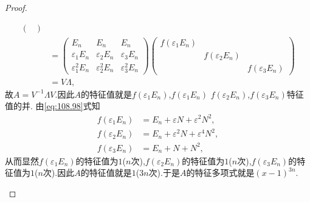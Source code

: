 \documentclass[../../main.tex]{subfiles}
\begin{document}
\begin{proof}
\begin{enumerate}[(1)]
\begin{align*}
\begin{pmatrix}
\end{pmatrix} \\
&= \begin{pmatrix}
E_n & E_n & E_n\\
\varepsilon_1 E_n & \varepsilon_2 E_n & \varepsilon_3 E_n\\
\varepsilon_1^2 E_n & \varepsilon_2^2 E_n & \varepsilon_3^2 E_n
\end{pmatrix} \begin{pmatrix}
f(\varepsilon_1 E_n) & & \\
& f(\varepsilon_2 E_n) & \\
& & f(\varepsilon_3 E_n)
\end{pmatrix}\\
& = V\Lambda,
\end{align*}
故$A = V^{-1}\Lambda V$.因此$A$的特征值就是$f(\varepsilon_1 E_n)$,$f(\varepsilon_1 E_n)$ $f(\varepsilon_2 E_n)$,$f(\varepsilon_3 E_n)$特征值的并.
由\eqref{eq:108.98}式知
\begin{align*}
f(\varepsilon_1 E_n) &=  E_n + \varepsilon N + \varepsilon^2 N^2, \\
f(\varepsilon_2 E_n) &=  E_n + \varepsilon^2 N + \varepsilon^4 N^2, \\
f(\varepsilon_3 E_n) &= E_n + N + N^2,
\end{align*}
从而显然$f(\varepsilon_1 E_n)$的特征值为$1$($n$次),$f(\varepsilon_2 E_n)$的特征值为$1$($n$次),$f(\varepsilon_3 E_n)$的特征值为$1$($n$次).因此$A$的特征值就是$1$($3n$次).于是$A$的特征多项式就是$(x - 1)^{3n} $.
\end{enumerate}

\end{proof}
\end{document}
